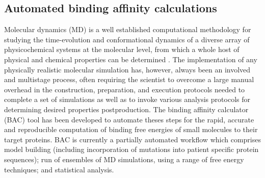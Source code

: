 \subsection{Automated binding affinity calculations}

Molecular dynamics (MD) is a well established computational methodology for studying the time-evolution and conformational dynamics of a diverse array of physicochemical systems at the molecular level, from which a whole host of physical and chemical properties can be determined \cite{Karplus2005}. 
The implementation of any physically realistic molecular simulation has, however, always been an involved and multistage process, often requiring the scientist to overcome a large manual overhead in the construction, preparation, and execution protocols needed to complete a set of simulations as well as to invoke various analysis protocols for determining desired properties postproduction.
The binding affinity calculator (BAC) \cite{Sadiq2008} tool has been developed to automate theses steps for the rapid, accurate and reproducible computation of binding free energies of small molecules to their target proteins.
BAC is currently a partially automated workflow which comprises model building (including incorporation of mutations into patient specific protein sequences); run of ensembles of MD simulations, using a range of free energy techniques; and statistical analysis.

